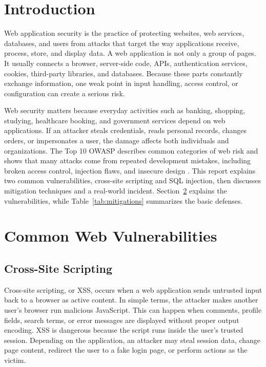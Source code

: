 \documentclass[12pt,a4paper]{article}
\begin{document}
\tableofcontents
\newpage

\section{Introduction}
\label{sec:introduction}

Web application security is the practice of protecting websites, web services, databases, and users from attacks that target the way applications receive, process, store, and display data. A web application is not only a group of pages. It usually connects a browser, server-side code, APIs, authentication services, cookies, third-party libraries, and databases. Because these parts constantly exchange information, one weak point in input handling, access control, or configuration can create a serious risk.

Web security matters because everyday activities such as banking, shopping, studying, healthcare booking, and government services depend on web applications. If an attacker steals credentials, reads personal records, changes orders, or impersonates a user, the damage affects both individuals and organizations. The Top 10 OWASP describes common categories of web risk and shows that many attacks come from repeated development mistakes, including broken access control, injection flaws, and insecure design \cite{owaspTop10}. This report explains two common vulnerabilities, cross-site scripting and SQL injection, then discusses mitigation techniques and a real-world incident. Section~\ref{sec:vulnerabilities} explains the vulnerabilities, while Table~\ref{tab:mitigations} summarizes the basic defenses.

\section{Common Web Vulnerabilities}
\label{sec:vulnerabilities}

\subsection{Cross-Site Scripting}
\label{subsec:xss}

Cross-site scripting, or XSS, occurs when a web application sends untrusted input back to a browser as active content. In simple terms, the attacker makes another user's browser run malicious JavaScript. This can happen when comments, profile fields, search terms, or error messages are displayed without proper output encoding. XSS is dangerous because the script runs inside the user's trusted session. Depending on the application, an attacker may steal session data, change page content, redirect the user to a fake login page, or perform actions as the victim.
\end{document}
